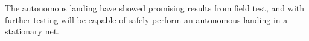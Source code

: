 The autonomous landing have showed promising results from field test, and with further testing will be capable of safely perform an autonomous landing in a stationary net.









